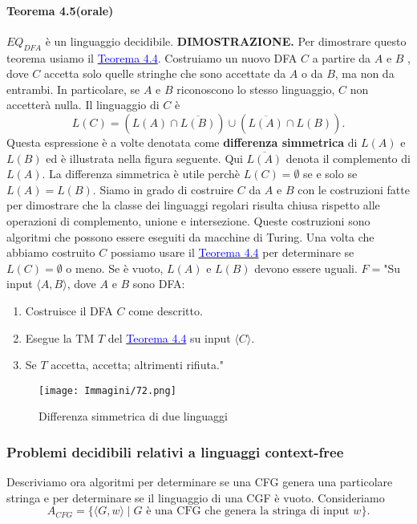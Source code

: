 \documentclass{article}
\begin{document}
\paragraph{Teorema 4.5(orale)}
\label{teorema-4.5}
$EQ_{DFA}$ è un linguaggio decidibile.
\vspace{1em}
\text{}
\newline
\hbox{\textbf{DIMOSTRAZIONE.}}
Per dimostrare questo teorema usiamo il \hyperref[teorema-4.4]{\textcolor{blue}{Teorema 4.4}}.
Costruiamo un nuovo DFA $C$ a partire da $A$ e $B$ , dove $C$ accetta solo quelle stringhe che sono accettate da $A$ o da $B$, ma non da entrambi.
In particolare, se $A$ e $B$ riconoscono lo stesso linguaggio, $C$ non accetterà nulla.
Il linguaggio di $C$ è
$$
L(C) = (L(A) \cap \overline{L(B)}) \cup (\overline{L(A)} \cap L(B)).
$$
Questa espressione è a volte denotata come \textbf{differenza simmetrica} di $L(A)$ e $L(B)$ ed è illustrata nella figura seguente.
Qui $\overline{L(A)}$ denota il complemento di $L(A)$.
La differenza simmetrica è utile perchè $L(C) = \emptyset$ se e solo se $L(A) = L(B)$.
Siamo in grado di costruire $C$ da $A$ e $B$ con le costruzioni fatte per dimostrare che la classe dei linguaggi regolari risulta chiusa rispetto alle operazioni di complemento, unione e intersezione.
Queste costruzioni sono algoritmi che possono essere eseguiti da macchine di Turing.
Una volta che abbiamo costruito $C$ possiamo usare il \hyperref[teorema-4.4]{\textcolor{blue}{Teorema 4.4}} per determinare se $L(C) = \emptyset$ o meno.
Se è vuoto, $L(A)$ e $L(B)$ devono essere uguali.
\vspace{1em}
\text{}
\newline
$F = $"Su input $\langle A,B \rangle$, dove $A$ e $B$ sono DFA:
\begin{enumerate}
    \item Costruisce il DFA $C$ come descritto.
    \item Esegue la TM $T$ del \hyperref[teorema-4.4]{\textcolor{blue}{Teorema 4.4}} su input $\langle C \rangle$.
    \item Se $T$ accetta, accetta; altrimenti rifiuta."
\end{enumerate}

\begin{figure}[H]
    \centering
    \texttt{[image: Immagini/72.png]}
    \caption{Differenza simmetrica di due linguaggi}
    \label{figura-4.6}
\end{figure}

\subsubsection{Problemi decidibili relativi a linguaggi context-free}
Descriviamo ora algoritmi per determinare se una CFG genera una particolare stringa e per determinare se il linguaggio di una CGF è vuoto.
\newline
Consideriamo
$$
A_{CFG} = \{\langle G,w \rangle \mid G \text{ è una CFG che genera la stringa di input } w \}.
$$
\end{document}
